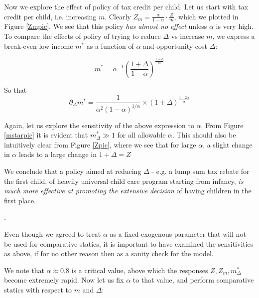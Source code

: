 \documentclass{homework}
\begin{document}

Now we explore the effect of policy of tax credit per child. Let us start with tax credit per child, i.e. increasing $m$. Clearly $Z_m = \frac{\alpha}{1-\alpha} \cdot \frac{Z}{m}$, which we plotted in Figure \ref{Zmpic}. We see that this policy \emph{has almost no effect} unless $\alpha$ is very high.
To compare the effects of policy of trying to reduce $\Delta$ vs increase $m$, we express a break-even low income $m^*$ as a function of $\alpha$ and opportunity cost $\Delta$:


\begin{equation}
    m^* = \alpha^{-1} \left(\frac{1+\Delta}{1-\alpha}\right)^\frac{1-\alpha}{\alpha}
\end{equation}

So that \begin{equation}
    \partial_\Delta m^* = \frac{1}{\alpha^2(1-\alpha)^{1/\alpha}} \times (1+\Delta)^\frac{1-2\alpha}{\alpha}
\end{equation}

Again, let us explore the sensitivity of the above expression to $\alpha$. From Figure \ref{mstarpic} it is evident that $m^*_\Delta \gg 1$ for all allowable $\alpha$. This should also be intuitively clear from Figure \ref{Zpic}, where we see that for large $\alpha$, a slight change in $\alpha$ leads to a large change in $1+\Delta = Z$

We conclude that a policy aimed at reducing $\Delta$ - e.g. a lump sum tax rebate for the first child, of heavily universal child care program starting from infancy, \emph{is much more effective at promoting the extensive decision} of having children in the first place.

.

Even though we agreed to treat $\alpha$ as a fixed exogenous parameter that will not be used for comparative statics, it is important to have examined the sensitivities as above, if for no other reason then as a sanity check for the model.

We note that $\alpha\approx0.8$ is a critical value, above which the responses $Z, Z_m, m^*_\Delta$ become extremely rapid. Now let us fix $\alpha$ to that value, and perform comparative statics with respect to $m$ and $\Delta$:
\end{document}
